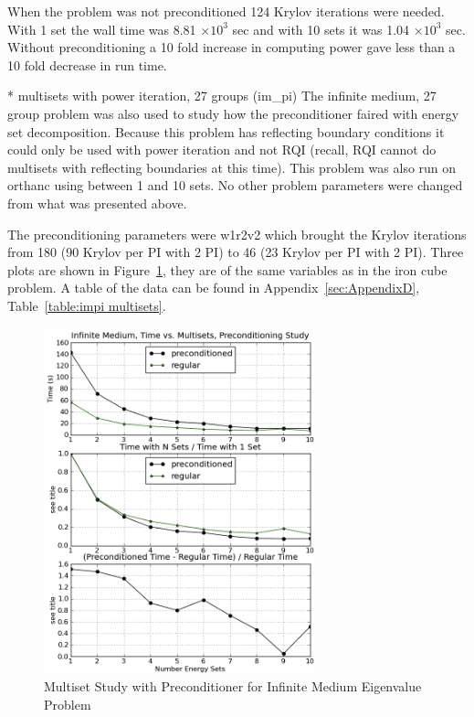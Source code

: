 When the problem was not preconditioned 124 Krylov iterations were needed. With 1 set the wall time was 8.81 $\times 10^{3}$ sec and with 10 sets it was 1.04 $\times 10^{3}$ sec. Without preconditioning a 10 fold increase in computing power gave less than a 10 fold decrease in run time.

* multisets with power iteration, 27 groups (im\_pi)
The infinite medium, 27 group problem was also used to study how the preconditioner faired with energy set decomposition. Because this problem has reflecting boundary conditions it could only be used with power iteration and not RQI (recall, RQI cannot do multisets with reflecting boundaries at this time). This problem was also run on orthanc using between 1 and 10 sets. No other problem parameters were changed from what was presented above. 

The preconditioning parameters were w1r2v2 which brought the Krylov iterations from 180 (90 Krylov per PI with 2 PI) to 46 (23 Krylov per PI with 2 PI). Three plots are shown in Figure~\ref{fig:impi multisets}, they are of the same variables as in the iron cube problem. A table of the data can be found in Appendix~\ref{sec:AppendixD}, Table~\ref{table:impi multisets}.
%
\begin{figure}[!ht]
    \begin{center}
      \includegraphics [width=0.7\textwidth, height=0.8\textheight] {impimultisets}
   \end{center}
   \caption{Multiset Study with Preconditioner for Infinite Medium Eigenvalue Problem}
   \label{fig:impi multisets}
\end{figure}

